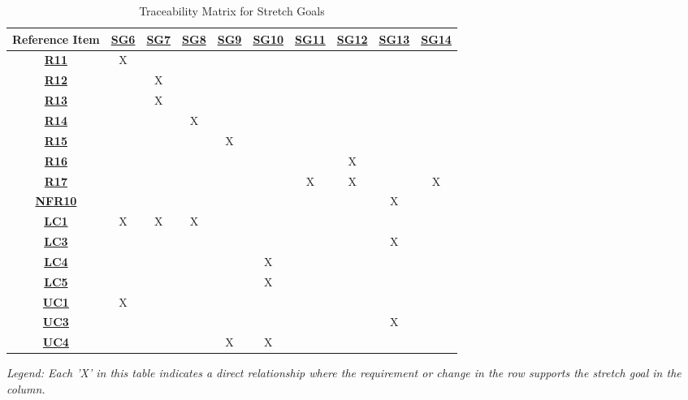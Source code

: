 \begin{table}[ht]
\centering
\begin{tabular}{|c|c|c|c|c|c|c|c|c|c|}
\hline
\textbf{Reference Item} &
\hyperref[G_local_multiplayer]{\textbf{SG6}} &
\hyperref[G_singleplayer]{\textbf{SG7}} &
\hyperref[G_matchmaking]{\textbf{SG8}} &
\hyperref[G_saving]{\textbf{SG9}} &
\hyperref[G_customization2]{\textbf{SG10}} &
\hyperref[G_skins]{\textbf{SG11}} &
\hyperref[G_stats]{\textbf{SG12}} &
\hyperref[G_platforms]{\textbf{SG13}} &
\hyperref[G_highlights]{\textbf{SG14}} \\ \hline
\hyperref[R11]{\textbf{R11}} &X & & & & & & & & \\ \hline
\hyperref[R12]{\textbf{R12}} & &X & & & & & & & \\ \hline
\hyperref[R13]{\textbf{R13}} & &X & & & & & & & \\ \hline
\hyperref[R14]{\textbf{R14}} & & &X & & & & & & \\ \hline
\hyperref[R15]{\textbf{R15}} & & & &X & & & & & \\ \hline
\hyperref[R16]{\textbf{R16}} & & & & & & &X & & \\ \hline
\hyperref[R17]{\textbf{R17}} & & & & & &X &X & &X \\ \hline
\hyperref[NFR10]{\textbf{NFR10}} & & & & & & & &X & \\ \hline
\hyperref[LC_find_opp]{\textbf{LC1}} &X &X &X & & & & & & \\ \hline
\hyperref[LC_platforms]{\textbf{LC3}} & & & & & & & &X & \\ \hline
\hyperref[LC_score_calc]{\textbf{LC4}} & & & & &X & & & & \\ \hline
\hyperref[LC_num_players]{\textbf{LC5}} & & & & &X & & & & \\ \hline
\hyperref[ULC_multiplayer]{\textbf{UC1}} &X & & & & & & & & \\ \hline
\hyperref[ULC_godot]{\textbf{UC3}} & & & & & & & &X & \\ \hline
\hyperref[ULC_customization]{\textbf{UC4}} & & & &X &X & & & & \\ \hline
\end{tabular}
\caption{Traceability Matrix for Stretch Goals}
\textit{Legend: Each 'X' in this table indicates a direct relationship where the requirement or change in the row supports the stretch goal in the column.}
\label{table:stretch_goals_traceability}
\end{table}